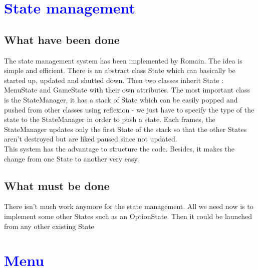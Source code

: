 \documentclass[article]{report} %
\begin{document}
		\chapter{\textcolor{blue}{State management}}
			\section{What have been done}
				The state management system has been implemented by Romain. The idea is simple and efficient. There is an abstract class State which can basically be started up, updated and shutted down. Then two classes inherit State : MenuState and GameState with their own attributes. The most important class is the StateManager, it has a stack of State which can be easily popped and pushed from other classes using reflexion - we just have to specify the type of the state to the StateManager in order to push a state. Each frames, the StateManager updates only the first State of the stack so that the other States aren't destroyed but are liked paused since not updated.\\

This system has the advantage to structure the code. Besides, it makes the change from one State to another very easy.
			\section{What must be done}
		There isn't much work anymore for the state management. All we need now is to implement some other States such as an OptionState. Then it could be launched from any other existing State

		\chapter{\textcolor{blue}{Menu}}
\end{document}
